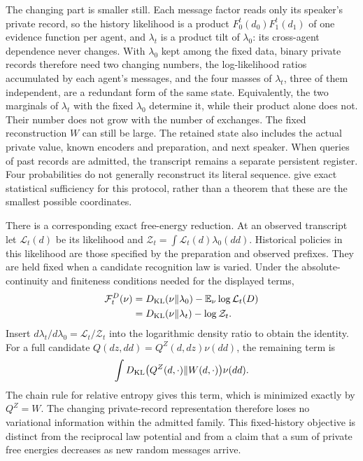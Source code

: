 The changing part is smaller still. Each message factor reads only its speaker's private record, so the history likelihood is a product $F_0^t(d_0)F_1^t(d_1)$ of one evidence function per agent, and $\lambda_t$ is a product tilt of $\lambda_0$: its cross-agent dependence never changes. With $\lambda_0$ kept among the fixed data, binary private records therefore need two changing numbers, the log-likelihood ratios accumulated by each agent's messages, and the four masses of $\lambda_t$, three of them independent, are a redundant form of the same state. Equivalently, the two marginals of $\lambda_t$ with the fixed $\lambda_0$ determine it, while their product alone does not. Their number does not grow with the number of exchanges. The fixed reconstruction $W$ can still be large. The retained state also includes the actual private value, known encoders and preparation, and next speaker. When queries of past records are admitted, the transcript remains a separate persistent register. Four probabilities do not generally reconstruct its literal sequence.  give exact statistical sufficiency for this protocol, rather than a theorem that these are the smallest possible coordinates.

There is a corresponding exact free-energy reduction. At an observed transcript let $\mathcal L_t(d)$ be its likelihood and $\mathcal Z_t=\int\mathcal L_t(d)\lambda_0(dd)$. Historical policies in this likelihood are those specified by the preparation and observed prefixes. They are held fixed when a candidate recognition law is varied. Under the absolute-continuity and finiteness conditions needed for the displayed terms,
\begin{equation}
\begin{aligned}
\mathcal F_t^D(\nu)
&=D_{\mathrm{KL}}(\nu\Vert\lambda_0)-\mathbb E_\nu\log\mathcal L_t(D)\\
&=D_{\mathrm{KL}}(\nu\Vert\lambda_t)-\log \mathcal Z_t.
\end{aligned}
\label{comp:eq-interaction-free-energy}
\end{equation}
Insert $d\lambda_t/d\lambda_0=\mathcal L_t/\mathcal Z_t$ into the logarithmic density ratio to obtain the identity. For a full candidate $Q(dz,dd)=Q^Z(d,dz)\nu(dd)$, the remaining term is
\begin{equation}
\int D_{\mathrm{KL}}\bigl(Q^Z(d,\cdot)\Vert W(d,\cdot)\bigr)\nu(dd).
\end{equation}
The chain rule for relative entropy gives this term, which is minimized exactly by $Q^Z=W$. The changing private-record representation therefore loses no variational information within the admitted family. This fixed-history objective is distinct from the reciprocal law potential and from a claim that a sum of private free energies decreases as new random messages arrive.

